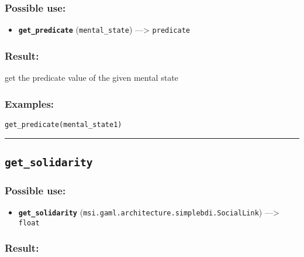 \documentclass[]{book}
\providecommand{\tightlist}{%
  \setlength{\itemsep}{0pt}\setlength{\parskip}{0pt}}
\theoremstyle{definition}
\theoremstyle{definition}
\theoremstyle{definition}
\theoremstyle{remark}
\begin{document}
\subsubsection{Possible use:}\label{possible-use-226}

\begin{itemize}
\tightlist
\item
  \textbf{\texttt{get\_predicate}} (\texttt{mental\_state})
  ---\textgreater{} \texttt{predicate}
\end{itemize}

\subsubsection{Result:}\label{result-220}

get the predicate value of the given mental state

\subsubsection{Examples:}\label{examples-173}

\begin{verbatim}
get_predicate(mental_state1) 
\end{verbatim}

\begin{center}\rule{0.5\linewidth}{\linethickness}\end{center}

\subsection{\texorpdfstring{\texttt{get\_solidarity}}{get\_solidarity}}\label{get_solidarity}

\subsubsection{Possible use:}\label{possible-use-227}

\begin{itemize}
\tightlist
\item
  \textbf{\texttt{get\_solidarity}}
  (\texttt{msi.gaml.architecture.simplebdi.SocialLink})
  ---\textgreater{} \texttt{float}
\end{itemize}

\subsubsection{Result:}\label{result-221}
\end{document}
